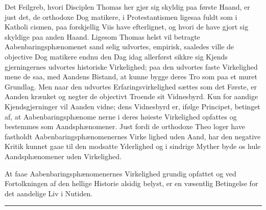 \documentclass[12pt]{book}
\newcommand{\opage}[1]{\marginnote{\footnotesize\textit{[#1]}}}
\begin{document}
Det Feilgreb, hvori Disciplen Thomas her gjør sig
skyldig paa første Haand, er just det, de orthodoxe Dog\-%
matikere, i Protestantismen ligesaa fuldt som i Katholi\-%
\opage{175}\setcounter{footnote}{0}%
cismen, paa forskjellig Viis have efterlignet, og hvori de
have gjort sig skyldige paa anden Haand. Ligesom
Thomas helst vil betragte Aabenbaringsphænomenet sand\-%
selig udvortes, empirisk, saaledes ville de objective Dog\-%
matikere endnu den Dag idag allerførst sikkre sig Kjends\-%
gjerningernes udvortes historiske Virkelighed; paa den
udvortes faste Virkelighed mene de saa, med Aandens
Bistand, at kunne bygge deres Tro som paa et muret
Grundlag. Men naar den udvortes Erfaringsvirkelighed
sættes som det Første, er Aanden krænket og negter de
objectivt Troende sit Vidnesbyrd. Kun for aandige
Kjendsgjerninger vil Aanden vidne; dens Vidnesbyrd er,
ifølge Principet, betinget af, at Aabenbaringsphænome\-%
nerne i deres høieste Virkelighed opfattes og bestemmes
som Aandsphænomener. Just fordi de orthodoxe Theo\-%
loger have fastholdt Aabenbaringsphænomenernes Virke\-%
lighed uden Aand, har den negative Kritik kunnet gaae
til den modsatte Yderlighed og i sindrige Myther byde
os hule Aandsphænomener uden Virkelighed.

At faae Aabenbaringsphænomenernes Virkelighed
grundig opfattet og ved Fortolkningen af den hellige
Historie alsidig belyst, er en væsentlig Betingelse for det
aandelige Liv i Nutiden.

\begin{center}\rule{3cm}{0.4pt}\end{center}
\end{document}
